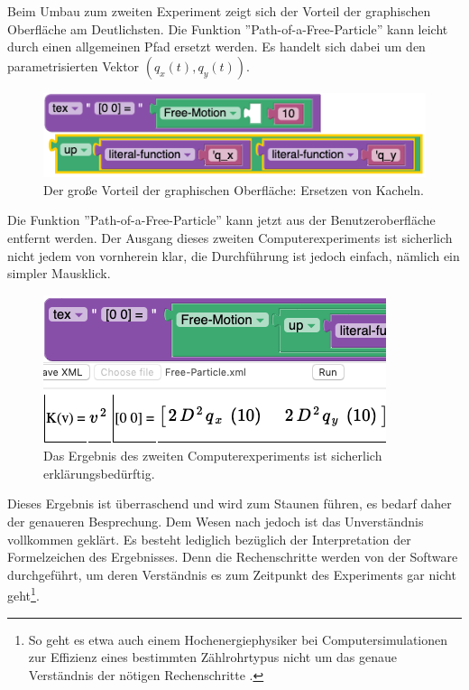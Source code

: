\documentclass[twocolumn, 10pt]{article}
\begin{document}
Beim Umbau zum zweiten Experiment zeigt sich der Vorteil der graphischen Oberfläche am Deutlichsten. Die Funktion ''Path-of-a-Free-Particle'' kann leicht durch einen allgemeinen Pfad ersetzt werden. Es handelt sich dabei um den parametrisierten Vektor $(q_x(t), q_y(t))$.

\begin{figure}[H]
\includegraphics[scale=0.4]{bilder/session_51.png}
\caption{Der große Vorteil der graphischen Oberfläche: Ersetzen von Kacheln.}
\label{fig:session51}
\end{figure}

Die Funktion ''Path-of-a-Free-Particle'' kann jetzt aus der Benutzeroberfläche entfernt werden.
Der Ausgang dieses zweiten Computerexperiments ist sicherlich nicht jedem von vornherein klar, die Durchführung ist jedoch einfach, nämlich ein simpler Mausklick.

\begin{figure}[H]
\includegraphics[scale=0.4]{bilder/session_62.png}
\caption{Das Ergebnis des zweiten Computerexperiments ist sicherlich erklärungsbedürftig.}
\label{fig:session62}
\end{figure}

Dieses Ergebnis ist überraschend und wird zum Staunen führen, es bedarf daher der genaueren Besprechung. Dem Wesen nach jedoch ist das Unverständnis vollkommen geklärt. Es besteht lediglich bezüglich der Interpretation der Formelzeichen des Ergebnisses. Denn die Rechenschritte werden von der Software durchgeführt, um deren Verständnis es zum Zeitpunkt des Experiments gar nicht geht\footnote{So geht es etwa auch einem Hochenergiephysiker bei Computersimulationen zur Effizienz eines bestimmten Zählrohrtypus nicht um das genaue Verständnis der nötigen Rechenschritte \cite{cKLMCern 21}.}.
\end{document}
